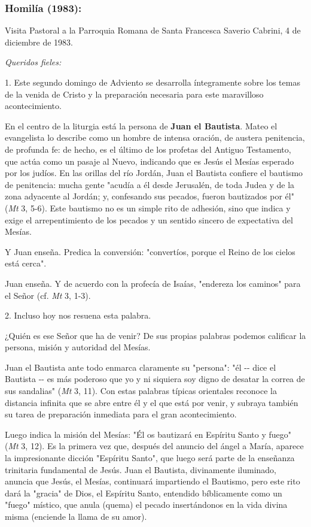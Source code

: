 \subsubsection{Homilía (1983): }
Visita Pastoral a la Parroquia Romana de Santa Francesca Saverio
Cabrini, 4 de diciembre de 1983.

\emph{Queridos fieles:}

1. Este segundo domingo de Adviento se desarrolla íntegramente sobre los
temas de la venida de Cristo y la preparación necesaria para este
maravilloso acontecimiento.

En el centro de la liturgia está la persona de \textbf{Juan el
	Bautista}. Mateo el evangelista lo describe como un hombre de intensa
oración, de austera penitencia, de profunda fe: de hecho, es el último
de los profetas del Antiguo Testamento, que actúa como un pasaje al
Nuevo, indicando que es Jesús el Mesías esperado por los judíos. En las
orillas del río Jordán, Juan el Bautista confiere el bautismo de
penitencia: mucha gente "acudía a él desde Jerusalén, de toda Judea y de
la zona adyacente al Jordán; y, confesando sus pecados, fueron
bautizados por él" (\emph{Mt} 3, 5-6). Este bautismo no es un simple
rito de adhesión, sino que indica y exige el arrepentimiento de los
pecados y un sentido sincero de expectativa del Mesías.

Y Juan enseña. Predica la conversión: "convertíos, porque el Reino de
los cielos está cerca".

Juan enseña. Y de acuerdo con la profecía de Isaías, "endereza los
caminos" para el Señor (cf. \emph{Mt} 3, 1-3).

2. Incluso hoy nos resuena esta palabra.

¿Quién es ese Señor que ha de venir? De sus propias palabras podemos
calificar la persona, misión y autoridad del Mesías.

Juan el Bautista ante todo enmarca claramente su "persona": "él -\/-
dice el Bautista -\/- es más poderoso que yo y ni siquiera soy digno de
desatar la correa de sus sandalias" (\emph{Mt} 3, 11). Con estas
palabras típicas orientales reconoce la distancia infinita que se abre
entre él y el que está por venir, y subraya también su tarea de
preparación inmediata para el gran acontecimiento.

Luego indica la misión del Mesías: "Él os bautizará en Espíritu Santo y
fuego" (\emph{Mt} 3, 12). Es la primera vez que, después del anuncio del
ángel a María, aparece la impresionante dicción "Espíritu Santo", que
luego será parte de la enseñanza trinitaria fundamental de Jesús. Juan
el Bautista, divinamente iluminado, anuncia que Jesús, el Mesías,
continuará impartiendo el Bautismo, pero este rito dará la "gracia" de
Dios, el Espíritu Santo, entendido bíblicamente como un "fuego" místico,
que anula (quema) el pecado insertándonos en la vida divina misma
(enciende la llama de su amor).

